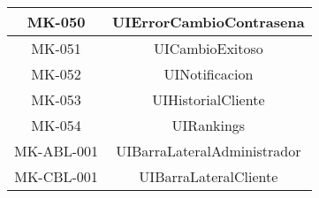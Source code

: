 \begin{longtable}{|c|c|}
MK-050 & UIErrorCambioContrasena \\
\hline

MK-051 & UICambioExitoso  \\
\hline

MK-052 & UINotificacion  \\
\hline

MK-053 & UIHistorialCliente  \\
\hline

MK-054 & UIRankings  \\
\hline

MK-ABL-001 & UIBarraLateralAdministrador \\
\hline

MK-CBL-001 & UIBarraLateralCliente \\
\hline
\end{longtable}

